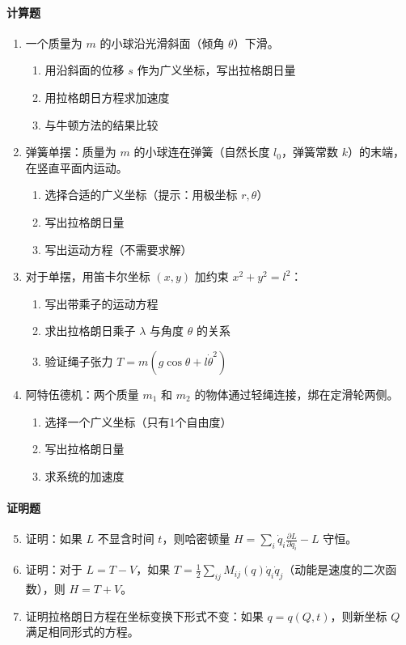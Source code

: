 \paragraph{计算题}
\begin{enumerate}
    \item 一个质量为 $m$ 的小球沿光滑斜面（倾角 $\theta$）下滑。
    \begin{enumerate}
        \item 用沿斜面的位移 $s$ 作为广义坐标，写出拉格朗日量
        \item 用拉格朗日方程求加速度
        \item 与牛顿方法的结果比较
    \end{enumerate}
    
    \item 弹簧单摆：质量为 $m$ 的小球连在弹簧（自然长度 $l_0$，弹簧常数 $k$）的末端，在竖直平面内运动。
    \begin{enumerate}
        \item 选择合适的广义坐标（提示：用极坐标 $r, \theta$）
        \item 写出拉格朗日量
        \item 写出运动方程（不需要求解）
    \end{enumerate}
    
    \item 对于单摆，用笛卡尔坐标 $(x, y)$ 加约束 $x^2 + y^2 = l^2$：
    \begin{enumerate}
        \item 写出带乘子的运动方程
        \item 求出拉格朗日乘子 $\lambda$ 与角度 $\theta$ 的关系
        \item 验证绳子张力 $T = m(g\cos\theta + l\dot{\theta}^2)$
    \end{enumerate}
    
    \item 阿特伍德机：两个质量 $m_1$ 和 $m_2$ 的物体通过轻绳连接，绑在定滑轮两侧。
    \begin{enumerate}
        \item 选择一个广义坐标（只有1个自由度）
        \item 写出拉格朗日量
        \item 求系统的加速度
    \end{enumerate}
\end{enumerate}

\paragraph{证明题}
\begin{enumerate}
    \setcounter{enumi}{4}
    \item 证明：如果 $L$ 不显含时间 $t$，则哈密顿量 $H = \sum_i \dot{q}_i \frac{\partial L}{\partial \dot{q}_i} - L$ 守恒。
    
    \item 证明：对于 $L = T - V$，如果 $T = \frac{1}{2}\sum_{ij} M_{ij}(q)\dot{q}_i\dot{q}_j$（动能是速度的二次函数），则 $H = T + V$。
    
    \item 证明拉格朗日方程在坐标变换下形式不变：如果 $q = q(Q, t)$，则新坐标 $Q$ 满足相同形式的方程。
\end{enumerate}

